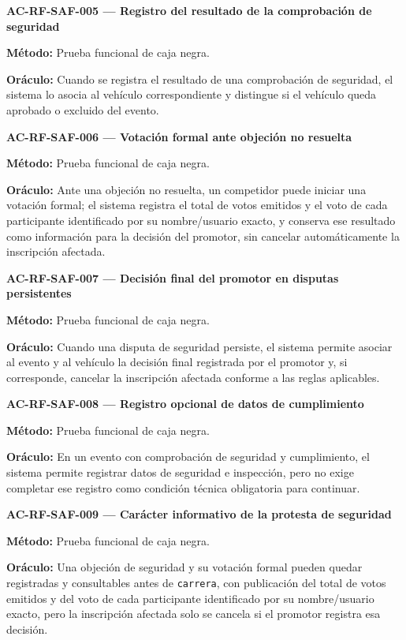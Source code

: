 \documentclass[10pt,letterpaper]{article}
\begin{document}
\noindent\textbf{AC-RF-SAF-005 --- Registro del resultado de la comprobación de seguridad}\par
\textbf{Método:} Prueba funcional de caja negra.\par
\textbf{Oráculo:} Cuando se registra el resultado de una comprobación de seguridad, el sistema lo asocia al vehículo correspondiente y distingue si el vehículo queda aprobado o excluido del evento.\par\vspace{0.45em}
\noindent\textbf{AC-RF-SAF-006 --- Votación formal ante objeción no resuelta}\par
\textbf{Método:} Prueba funcional de caja negra.\par
\textbf{Oráculo:} Ante una objeción no resuelta, un competidor puede iniciar una votación formal; el sistema registra el total de votos emitidos y el voto de cada participante identificado por su nombre/usuario exacto, y conserva ese resultado como información para la decisión del promotor, sin cancelar automáticamente la inscripción afectada.\par\vspace{0.45em}
\noindent\textbf{AC-RF-SAF-007 --- Decisión final del promotor en disputas persistentes}\par
\textbf{Método:} Prueba funcional de caja negra.\par
\textbf{Oráculo:} Cuando una disputa de seguridad persiste, el sistema permite asociar al evento y al vehículo la decisión final registrada por el promotor y, si corresponde, cancelar la inscripción afectada conforme a las reglas aplicables.\par\vspace{0.45em}
\noindent\textbf{AC-RF-SAF-008 --- Registro opcional de datos de cumplimiento}\par
\textbf{Método:} Prueba funcional de caja negra.\par
\textbf{Oráculo:} En un evento con comprobación de seguridad y cumplimiento, el sistema permite registrar datos de seguridad e inspección, pero no exige completar ese registro como condición técnica obligatoria para continuar.\par\vspace{0.45em}
\noindent\textbf{AC-RF-SAF-009 --- Carácter informativo de la protesta de seguridad}\par
\textbf{Método:} Prueba funcional de caja negra.\par
\textbf{Oráculo:} Una objeción de seguridad y su votación formal pueden quedar registradas y consultables antes de \texttt{carrera}, con publicación del total de votos emitidos y del voto de cada participante identificado por su nombre/usuario exacto, pero la inscripción afectada solo se cancela si el promotor registra esa decisión.\par\vspace{0.45em}
\end{document}
